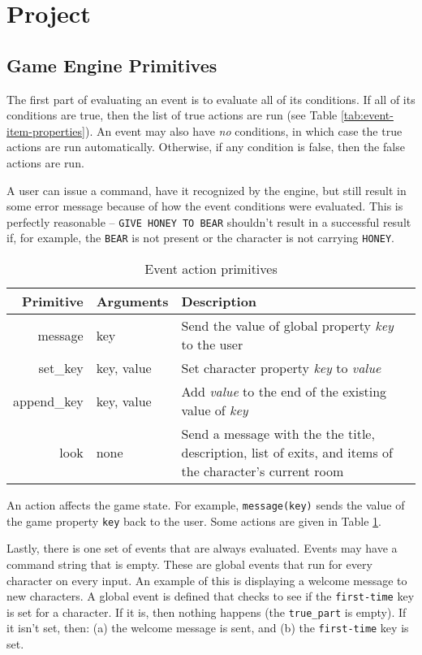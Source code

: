 \documentclass{article}
\newcommand{\enterProblemHeader}[1]{
}
\newcommand{\exitProblemHeader}[1]{
\nobreak\extramarks{#1}{}\nobreak
}
\newcounter{homeworkProblemCounter} %
\newcommand{\homeworkProblemName}{}
\newenvironment{homeworkProblem}[1][Problem \arabic{homeworkProblemCounter}]{ %
\stepcounter{homeworkProblemCounter} %
\renewcommand{\homeworkProblemName}{#1} %
\section{\homeworkProblemName} %
\enterProblemHeader{\homeworkProblemName} %
}{
\exitProblemHeader{\homeworkProblemName} %
}
\newcommand{\homeworkSectionName}{}
\newenvironment{homeworkSection}[1]{ %
\renewcommand{\homeworkSectionName}{#1} %
\subsection{\homeworkSectionName} %
\enterProblemHeader{\homeworkProblemName\ [\homeworkSectionName]} %
}{
\enterProblemHeader{\homeworkProblemName} %
}
\begin{document}
\begin{homeworkProblem}[Project]
\begin{homeworkSection}{Game Engine Primitives}
	The first part of evaluating an event is to evaluate all of its conditions. If all of its conditions are true, then the list of true actions are run (see Table \ref{tab:event-item-properties}). An event may also have \textit{no} conditions, in which case the true actions are run automatically. Otherwise, if any condition is false, then the false actions are run.

	A user can issue a command, have it recognized by the engine, but still result in some error message because of how the event conditions were evaluated. This is perfectly reasonable -- \texttt{GIVE HONEY TO BEAR} shouldn't result in a successful result if, for example, the \texttt{BEAR} is not present or the character is not carrying \texttt{HONEY}.

	\begin{table}
		\begin{tabularx}{\textwidth}{|r|l|X|}
			\hline
			Primitive & Arguments & Description \\
			\hline \hline
			message     & key        & Send the value of global property \textit{key} to the user \\
			set\_key    & key, value & Set character property \textit{key} to \textit{value} \\
			append\_key & key, value & Add \textit{value} to the end of the existing value of \textit{key} \\
			look        & none       & Send a message with the the title, description, list of exits, and items of the character's current room \\
			\hline
		\end{tabularx}
		\caption{Event action primitives}
		\label{tab:event-action-primitives}
	\end{table}

	An action affects the game state. For example, \texttt{message(key)} sends the value of the game property \texttt{key} back to the user. Some actions are given in Table \ref{tab:event-action-primitives}.

	Lastly, there is one set of events that are always evaluated. Events may have a command string that is empty. These are global events that run for every character on every input. An example of this is displaying a welcome message to new characters. A global event is defined that checks to see if the \texttt{first-time} key is set for a character. If it is, then nothing happens (the \texttt{true\_part} is empty). If it isn't set, then: (a) the welcome message is sent, and (b) the \texttt{first-time} key is set.
\end{homeworkSection}



\end{homeworkProblem}
\end{document}
